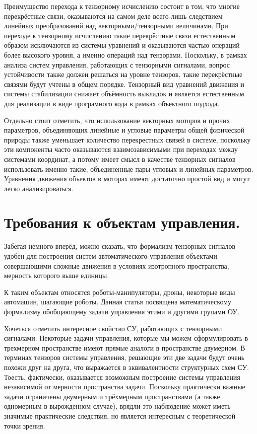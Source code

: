 \documentclass[a4paper]{article}
\begin{document}
Преимущество перехода к тензорному исчислению состоит в том, что многие перекрёстные связи, оказываются на самом деле всего-лишь следствием линейных преобразований над векторными/тензорными величинами. При переходе к тензорному исчислению такие перекрёстные связи естественным образом исключаются из системы уравнений и оказываются частью операций более высокого уровня, а именно операций над тензорами. Поскольку, в рамках анализа систем управления, работающих с тензорными сигналами, вопрос устойчивости также должен решаться на уровне тензоров, такие перекрёстные связями будут учтены в общем порядке. Тензорный вид уравнений движения и системы стабилизации снижает объёмность выкладок и является естественным для реализации в виде програмного кода в рамках объектного подхода. 

Отдельно стоит отметить, что использование векторных моторов и прочих параметров, объединяющих линейные и угловые параметры общей физической природы также уменьшает количество перекрестных связей в системе, поскольку эти компоненты часто оказываются взаимозависимыми при переходах между системами координат, а потому имеет смысл в качестве тензорных сигналов использовать именно такие, объединенные пары угловых и линейных параметров. Уравнения движения объектов в моторах имеют достаточно простой вид и могут легко анализироваться.

\section{Требования к объектам управления.}
Забегая немного вперёд, можно сказать, что формализм тензорных сигналов удобен для построения систем автоматического управления объектами совершающими сложные движения в условиях изотропного пространства, мерность которого выше единицы.

К таким объектам относятся роботы-манипуляторы, дроны, некоторые виды автомашин, шагающие роботы. 
Данная статья посвящена математическому формализму обобщающему задачи управления этими и другими групами ОУ.

Хочеться отметить интересное свойство СУ, работающих с тензорными сигналами. Некоторые задачи управления, которые мы можем сформулировать в трехмерном пространстве имеют прямые аналоги в пространстве двумерном. В терминах тензоров системы управления, решающие эти две задачи будут очень похожи друг на друга, что выражается в эквивалентности структурных схем СУ. Тоесть, фактически, оказывается возможным построение системы управления независимой от мерности пространства задачи. Поскольку практически важные задачи ограничены двумерным и трёхмерным пространствами (а также одномерным в вырожденном случае), врядли это наблюдение может иметь значимые практические следствия, но является интересным с теоретической точки зрения. 
\end{document}
